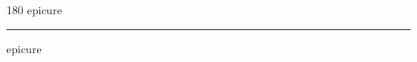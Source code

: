 
\begin{frame}
\begin{center}
\begin{turn}{180}
{\fontsize{2.5cm}{1em}\selectfont epicure}
\end{turn}
\vspace{1em}\par  
\hrule
\vspace{1em}\par  
{\fontsize{2.5cm}{1em}\selectfont epicure}
\end{center}
\end{frame}
